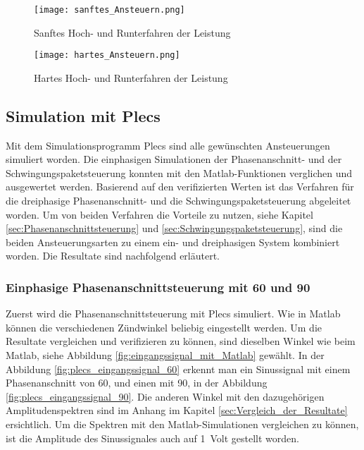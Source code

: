 \begin{figure}[ht!]
	\centering
	\texttt{[image: sanftes\_Ansteuern.png]}	
	\caption{Sanftes Hoch- und Runterfahren der Leistung}
	\label{fig:sanftes_Ansteuern}
\end{figure}

\begin{figure}[ht!]
	\centering
	\texttt{[image: hartes\_Ansteuern.png]}	
	\caption{Hartes Hoch- und Runterfahren der Leistung}
	\label{fig:hartes_Ansteuern}
\end{figure}




\newpage
\subsection{Simulation mit Plecs}

Mit dem Simulationsprogramm Plecs sind alle gewünschten Ansteuerungen simuliert worden. Die einphasigen Simulationen der Phasenanschnitt- und der Schwingungspaketsteuerung konnten mit den Matlab-Funktionen verglichen und ausgewertet werden. Basierend auf den verifizierten Werten ist das Verfahren für die dreiphasige Phasenanschnitt- und die Schwingungspaketsteuerung abgeleitet worden. Um von beiden Verfahren die Vorteile zu nutzen, siehe Kapitel \ref{sec:Phasenanschnittsteuerung} und \ref{sec:Schwingungspaketsteuerung}, sind die beiden Ansteuerungsarten zu einem ein- und dreiphasigen System kombiniert worden. Die Resultate sind nachfolgend erläutert.  

\subsubsection{Einphasige Phasenanschnittsteuerung mit 60\textdegree \hspace{0.02cm} und 90\textdegree}

Zuerst wird die Phasenanschnittsteuerung mit Plecs simuliert. Wie in Matlab können die verschiedenen Zündwinkel beliebig eingestellt werden. Um die Resultate vergleichen und verifizieren zu können, sind dieselben Winkel wie beim Matlab, siehe Abbildung \ref{fig:eingangssignal_mit_Matlab} gewählt. In der Abbildung \ref{fig:plecs_eingangssignal_60} erkennt man ein Sinussignal mit einem Phasenanschnitt von 60\textdegree \hspace{0.02cm}, und einen mit 90\textdegree, in der Abbildung \ref{fig:plecs_eingangssignal_90}. Die anderen Winkel mit den dazugehörigen Amplitudenspektren sind im Anhang im Kapitel \ref{sec:Vergleich_der_Resultate} ersichtlich.
Um die Spektren mit den Matlab-Simulationen vergleichen zu können, ist die Amplitude des Sinussignales auch auf \SI{1}{Volt} gestellt worden.  

